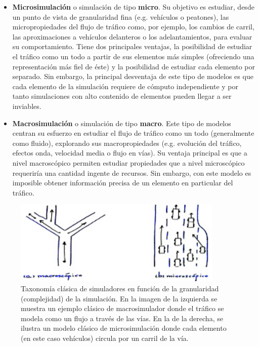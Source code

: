 \begin{itemize}
	\item \textbf{Microsimulación} o simulación de tipo \textbf{micro}. Su objetivo es estudiar, desde un punto de vista de granularidad fina (e.g. vehículos o peatones), las micropropiedades del flujo de tráfico como, por ejemplo, los cambios de carril, las aproximaciones a vehículos delanteros o los adelantamientos, para evaluar su comportamiento. Tiene dos principales ventajas, la posibilidad de estudiar el tráfico como un todo a partir de sus elementos más simples (ofreciendo una representación más fiel de éste) y la posibilidad de estudiar cada elemento por separado. Sin embargo, la principal desventaja de este tipo de modelos es que cada elemento de la simulación requiere de cómputo independiente y por tanto simulaciones con alto contenido de elementos pueden llegar a ser inviables.
	\item \textbf{Macrosimulación} o simulación de tipo \textbf{macro}. Este tipo de modelos centran su esfuerzo en estudiar el flujo de tráfico como un todo (generalmente como fluido), explorando sus macropropiedades (e.g. evolución del tráfico, efectos onda, velocidad media o flujo en vías). Su ventaja principal es que a nivel macroscópico permiten estudiar propiedades que a nivel microscópico requeriría una cantidad ingente de recursos. Sin embargo, con este modelo es imposible obtener información precisa de un elemento en particular del tráfico.
\end{itemize}

\begin{figure}
	\centering
	\includegraphics[width=10cm, height=4cm]{images/granularities-in-traffic-simulation}
	\caption{Taxonomía clásica de simuladores en función de la granularidad (complejidad) de la simulación. En la imagen de la izquierda se muestra un ejemplo clásico de macrosimulador donde el tráfico se modela como un flujo a través de las vías. En la de la derecha, se ilustra un modelo clásico de microsimulación donde cada elemento (en este caso vehículos) circula por un carril de la vía.}
	\label{fig:granularities-in-traffic-simulation}
\end{figure}

